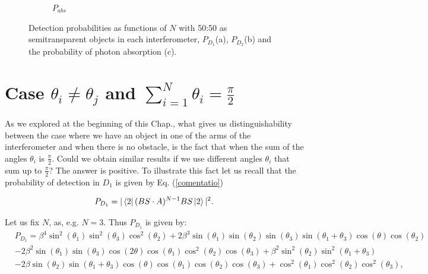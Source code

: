\documentclass[12pt]{book}
\begin{document}
\begin{figure}[!t]
\begin{subfigure}[b]{0.45\linewidth}
\caption{$P_{abs}$}
\label{fig:BS1}
\end{subfigure}
\caption{Detection probabilities as functions of $N$ with 50:50 as semitransparent objects in each interferometer, $P_{D_{1}}$(a), $P_{D_{2}}$(b) and the probability of photon absorption (c).}
\label{Azuma2}
\end{figure}




 


\section{Case $\theta_{i} \neq \theta_{j}$ and $\sum_{i=1}^{N}\theta_{i}=\frac{\pi}{2}$}

As we explored at the beginning of this Chap., what gives us distinguishability between the case where we have an object in one of the arms of the interferometer and when there is no obstacle, is the fact that when the sum of the angles $\theta_{i}$ is $\frac{ \pi}{2}$. Could we obtain similar results if we use different angles $\theta_{i}$ that sum up to $\frac{\pi}{2}$? The answer is positive. To illustrate this fact let us recall that the probability of detection in $D_{1}$ is given by Eq. (\ref{comentatio})

\begin{equation*}
P_{D_{1}}=|\bra{2} (BS \cdot A)^{N-1}BS \ket{2}|^2.
\end{equation*}

Let us fix $N$, as, e.g. $N=3$. Thus $P_{D_{1}}$ is given by:
\small
\begin{align*}
&P_{D_{1}}=\beta^{4} \sin^{2}{\left(\theta_{1} \right)} \sin^{2}{\left(\theta_{3} \right)} \cos^{2}{\left(\theta_{2} \right)} + 2 \beta^{3} \sin{\left(\theta_{1} \right)} \sin{\left(\theta_{2} \right)} \sin{\left(\theta_{3} \right)} \sin{\left(\theta_{1} + \theta_{3} \right)} \cos{\left(\theta \right)} \cos{\left(\theta_{2} \right)} \\
 & - 2 \beta^{2} \sin{\left(\theta_{1} \right)} \sin{\left(\theta_{3} \right)} \cos{\left(2 \theta \right)} \cos{\left(\theta_{1} \right)} \cos^{2}{\left(\theta_{2} \right)} \cos{\left(\theta_{3} \right)} + \beta^{2} \sin^{2}{\left(\theta_{2} \right)} \sin^{2}{\left(\theta_{1} + \theta_{3} \right)} \\
 & - 2 \beta \sin{\left(\theta_{2} \right)} \sin{\left(\theta_{1} + \theta_{3} \right)} \cos{\left(\theta \right)} \cos{\left(\theta_{1} \right)} \cos{\left(\theta_{2} \right)} \cos{\left(\theta_{3} \right)} + \cos^{2}{\left(\theta_{1} \right)} \cos^{2}{\left(\theta_{2} \right)} \cos^{2}{\left(\theta_{3} \right)},
\end{align*}
\normalsize
\end{document}
